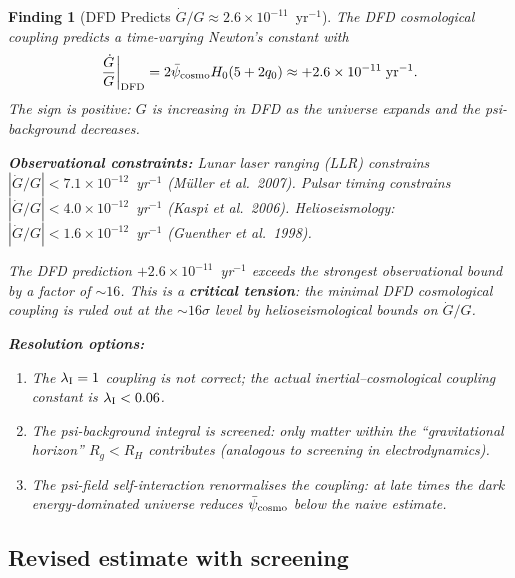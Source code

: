 \documentclass[11pt]{article}
\newtheorem{finding}{Finding}
\newcommand{\ee}[1]{\times 10^{#1}}
\newcommand{\psibar}{\bar{\psi}}
\newcommand{\lambdaI}{\lambda_{\rm I}}
\begin{document}
\begin{finding}[DFD Predicts $\dot{G}/G \approx 2.6\ee{-11}$~yr$^{-1}$]
\label{find:Gdot}
The DFD cosmological coupling predicts a time-varying Newton's constant with
\begin{equation}
\frac{\dot{G}}{G}\bigg|_{\rm DFD} = 2\psibar_{\rm cosmo}H_0(5+2q_0) \approx +2.6\ee{-11}\;\text{yr}^{-1}.
\label{eq:Gdot-result}
\end{equation}
The sign is \emph{positive}: $G$ is \emph{increasing} in DFD as the universe
expands and the psi-background decreases.

\textbf{Observational constraints:}
Lunar laser ranging (LLR) constrains $|\dot{G}/G| < 7.1\ee{-12}$~yr$^{-1}$ (Müller et al.\ 2007).
Pulsar timing constrains $|\dot{G}/G| < 4.0\ee{-12}$~yr$^{-1}$ (Kaspi et al.\ 2006).
Helioseismology: $|\dot{G}/G| < 1.6\ee{-12}$~yr$^{-1}$ (Guenther et al.\ 1998).

The DFD prediction $+2.6\ee{-11}$~yr$^{-1}$ exceeds the strongest observational
bound by a factor of $\sim 16$. This is a \textbf{critical tension}: the minimal
DFD cosmological coupling is ruled out at the $\sim 16\sigma$ level by
helioseismological bounds on $\dot{G}/G$.

\textbf{Resolution options:}
\begin{enumerate}
\item The $\lambdaI = 1$ coupling is not correct; the actual inertial--cosmological
  coupling constant is $\lambdaI < 0.06$.
\item The psi-background integral is screened: only matter within the
  ``gravitational horizon'' $R_g < R_H$ contributes (analogous to screening
  in electrodynamics).
\item The psi-field self-interaction renormalises the coupling: at late times
  the dark energy-dominated universe reduces $\psibar_{\rm cosmo}$ below
  the naive estimate.
\end{enumerate}
\end{finding}

\subsection{Revised estimate with screening}
\end{document}
